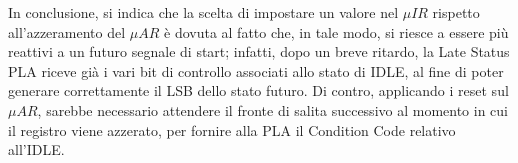 \noindent In conclusione, si indica che la scelta di impostare un valore nel $\mu IR$ rispetto all'azzeramento del $\mu AR$ è dovuta al fatto che, in tale modo, si riesce a essere più reattivi a un futuro segnale di start; infatti, dopo un breve ritardo, la Late Status PLA riceve già i vari bit di controllo associati allo stato di IDLE, al fine di poter generare correttamente il LSB dello stato futuro. Di contro, applicando i reset sul $\mu AR$, sarebbe necessario attendere il fronte di salita successivo al momento in cui il registro viene azzerato, per fornire alla PLA il Condition Code relativo all'IDLE.
